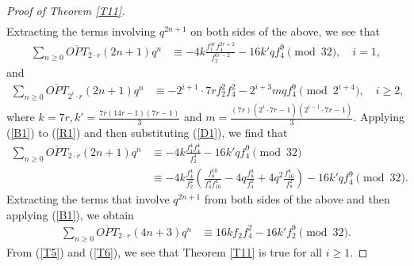 \documentclass[12pt,reqno,a4paper]{amsart}
\numberwithin{equation}{section}
\begin{document}
\begin{proof}[Proof of Theorem \ref{T11}]
\begin{align*}
    \end{align*}
    Extracting the terms involving $q^{2n+1}$ on both sides of the above, we see that 
    \begin{align}
       \label{R1} \sum_{n\geq 0}\overline{OPT}_{2\cdot r}(2n+1)q^n& \equiv-4k\frac{f_1^{4r}f_4^{2r+2}}{f_2^{6r-2}}-16k'qf_4^9\pmod{32},\quad i=1, 
       \end{align}
       and 
       \begin{align}
       \label{T5} \sum_{n\geq 0}\overline{OPT}_{2^i\cdot r}(2n+1)q^n& \equiv-2^{i+1}\cdot 7rf_2^2f_4^2-2^{i+3}mqf_4^9\pmod{2^{i+4}},\quad i\geq2,
       \end{align}
  where $k=7r, k'=\frac{7r(14r-1)(7r-1)}{3}$ and $m=\frac{(7r)(2^i\cdot 7r-1)(2^{i-1}\cdot 7r-1)}{3}$. 
    Applying (\ref{B1}) to (\ref{R1}) and then substituting (\ref{D1}), we find that
     \begin{align*}
        \sum_{n\geq 0}\overline{OPT}_{2\cdot r}(2n+1)q^n& \equiv -4k\frac{f_1^{4}f_4^{4}}{f_2^{4}}-16k'qf_4^9\pmod{32}\\
           & \equiv -4k\frac{f_4^{4}}{f_2^{2}}\left(\frac{f_8^{10}}{f_4^4f_{16}^4}-4q\frac{f_{8}^4}{f_4^2}+4q^2\frac{f_{16}^4}{f_8^2}\right)-16k'qf_4^9\pmod{32}.
    \end{align*}
     Extracting the terms that involve $q^{2n+1}$ from both sides of the above and then applying (\ref{B1}), we obtain
    \begin{align}\label{T6}
        \sum_{n\geq 0}\overline{OPT}_{2\cdot r}(4n+3)q^n& \equiv 16kf_2f_4^2-16k'f_2^9\pmod{32}.
    \end{align}
    From (\ref{T5}) and (\ref{T6}), we see that Theorem \ref{T11} is true for all $i\geq1$. 
\end{proof}
 
\end{document}
